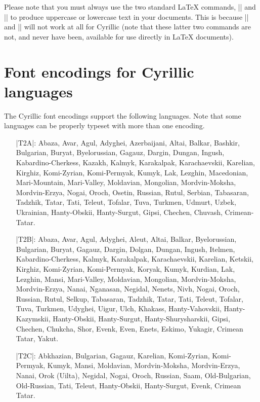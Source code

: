 \documentclass{ltxguide}[1999/02/28]
\begin{document}
Please note that you must always use the two standard \LaTeX{}
commands, |\MakeUppercase| and |\MakeLowercase| to produce uppercase
or lowercase text in your documents.  This is because |\uppercase| and
|\lowercase| will not work at all for Cyrillic (note that these latter
two commands are not, and never have been, available for use directly
in \LaTeX{} documents).


\section{Font encodings for Cyrillic languages}
\label{fontencs}

The Cyrillic font encodings support the following languages.  Note
that some languages can be properly typeset with more than one
encoding.

\begin{itemize}
\raggedright
\item[|T2A|:]
  Abaza, Avar, Agul, Adyghei, Azerbaijani, Altai, Balkar, Bashkir,
  Bulgarian, Buryat, Byelorussian, Gagauz, Dargin, Dungan, Ingush,
  Kabardino-Cherkess, Kazakh, Kalmyk, Karakalpak, Karachaevskii,
  Karelian, Kirghiz, Komi-Zyrian, Komi-Permyak, Kumyk, Lak, Lezghin,
  Macedonian, Mari-Mountain, Mari-Valley, Moldavian, Mongolian,
  Mordvin-Moksha, Mordvin-Erzya, Nogai, Oroch, Osetin, Russian, Rutul,
  Serbian, Tabasaran, Tadzhik, Tatar, Tati, Teleut, Tofalar, Tuva,
  Turkmen, Udmurt, Uzbek, Ukrainian, Hanty-Obskii, Hanty-Surgut,
  Gipsi, Chechen, Chuvash, Crimean-Tatar.
\item[|T2B|:]
  Abaza, Avar, Agul, Adyghei, Aleut, Altai, Balkar, Byelorussian,
  Bulgarian, Buryat, Gagauz, Dargin, Dolgan, Dungan, Ingush, Itelmen,
  Kabardino-Cherkess, Kalmyk, Karakalpak, Karachaevskii, Karelian,
  Ketskii, Kirghiz, Komi-Zyrian, Komi-Permyak, Koryak, Kumyk, Kurdian,
  Lak, Lezghin, Mansi, Mari-Valley, Moldavian, Mongolian,
  Mordvin-Moksha, Mordvin-Erzya, Nanai, Nganasan, Negidal, Nenets,
  Nivh, Nogai, Oroch, Russian, Rutul, Selkup, Tabasaran, Tadzhik,
  Tatar, Tati, Teleut, Tofalar, Tuva, Turkmen, Udyghei, Uigur, Ulch,
  Khakass, Hanty-Vahovskii, Hanty-Kazymskii, Hanty-Obskii,
  Hanty-Surgut, Hanty-Shurysharskii, Gipsi, Chechen, Chukcha, Shor,
  Evenk, Even, Enets, Eskimo, Yukagir, Crimean Tatar, Yakut.
\item[|T2C|:]
  Abkhazian, Bulgarian, Gagauz, Karelian, Komi-Zyrian, Komi-Permyak,
  Kumyk, Mansi, Moldavian, Mordvin-Moksha, Mordvin-Erzya, Nanai,
  Orok (Uilta), Negidal, Nogai, Oroch, Russian, Saam, Old-Bulgarian,
  Old-Russian, Tati, Teleut, Hanty-Obskii, Hanty-Surgut, Evenk,
  Crimean Tatar.
\end{itemize}
\end{document}
